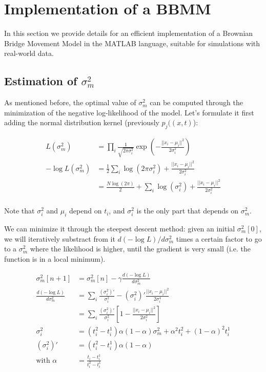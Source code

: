 \documentclass[12pt]{article}
\begin{document}
\section{Implementation of a BBMM}

In this section we provide details for an efficient implementation of a Brownian Bridge Movement Model in the MATLAB language, suitable for simulations with real-world data.

\subsection{Estimation of $\sigma_m^2$}

As mentioned before, the optimal value of $\sigma_m^2$ can be computed through the minimization of the negative log-likelihood of the model. Let's formulate it first adding the normal distribution kernel (previously $p_j((x,t)$):

\begin{align*}
    L(\sigma_m^2) &= \prod_i \frac{1}{\sqrt{2\pi\sigma_i^2}} \exp \left( -\frac{||x_i-\mu_i||^2}{2\sigma_i^2} \right) \\
    -\log L(\sigma_m^2) &= \frac{1}{2} \sum_i \log(2\pi\sigma_i^2) + \frac{||x_i-\mu_i||^2}{2\sigma_i^2} \\
    &= \frac{N\log(2\pi)}{2} + \sum_i \log(\sigma_i^2) + \frac{||x_i-\mu_i||^2}{2\sigma_i^2} \\
\end{align*}

Note that $\sigma_i^2$ and $\mu_i$ depend on $t_i$, and $\sigma_i^2$ is the only part that depends on $\sigma_m^2$.

We can minimize it through the steepest descent method: given an initial $\sigma_m^2[0]$, we will iteratively substract from it $d(-\log L)/d\sigma_m^2$ times a certain factor to go to a $\sigma_m^2$ where the likelihood is higher, until the gradient is very small (i.e. the function is in a local minimum).

\begin{align*}
    \sigma_m^2[n+1] &= \sigma_m^2[n] - \gamma \frac{d(-\log L)}{d\sigma_m^2} \\
    \frac{d(-\log L)}{d\sigma_m^2} &= \sum_i \frac{(\sigma_i^2)'}{\sigma_i^2} - (\sigma_i^2)'\frac{||x_i - \mu_i||^2}{2\sigma_i^4} \\
    &= \sum_i \frac{(\sigma_i^2)'}{\sigma_i^2} \left[ 1 -  \frac{||x_i - \mu_i||^2}{2\sigma_i^2} \right]\\
    \sigma_i^2 &= (t_i^2-t_i^1)\alpha(1-\alpha)\sigma_m^2 + \alpha^2t_i^2 + (1-\alpha)^2t_i^1 \\
    (\sigma_i^2)' &= (t_i^2-t_i^1)\alpha(1-\alpha) \\
    \text{with } \alpha &= \frac{t_i - t_i^1}{t_i^2 - t_i^1}
\end{align*}
\end{document}
